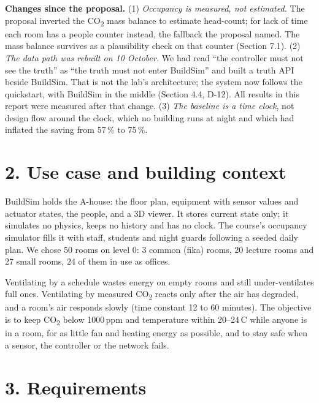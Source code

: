 \documentclass[11pt]{article}
\newcommand{\cotwo}{CO\textsubscript{2}}
\begin{document}
\textbf{Changes since the proposal.}
(1) \emph{Occupancy is measured, not estimated.} The proposal inverted the \cotwo{} mass
balance to estimate head-count; for lack of time each room has a people counter instead,
the fallback the proposal named. The mass balance survives as a plausibility check on that
counter (Section 7.1). (2) \emph{The data path was rebuilt on 10 October.} We had read
``the controller must not see the truth'' as ``the truth must not enter BuildSim'' and
built a truth API beside BuildSim. That is not the lab's architecture; the system now
follows the quickstart, with BuildSim in the middle (Section 4.4, D-12). All results in
this report were measured after that change. (3) \emph{The baseline is a time clock}, not
design flow around the clock, which no building runs at night and which had inflated the
saving from 57\,\% to 75\,\%.

\section{2. Use case and building context}

BuildSim holds the A-house: the floor plan, equipment with sensor values and actuator
states, the people, and a 3D viewer. It stores current state only; it simulates no
physics, keeps no history and has no clock. The course's occupancy simulator fills it with
staff, students and night guards following a seeded daily plan. We chose 50 rooms on
level 0: 3 common (fika) rooms, 20 lecture rooms and 27 small rooms, 24 of them in use as offices.

Ventilating by a schedule wastes energy on empty rooms and still under-ventilates full
ones. Ventilating by measured \cotwo{} reacts only after the air has degraded, and a
room's air responds slowly (time constant 12 to 60 minutes). The objective is to keep
\cotwo{} below 1000\,ppm and temperature within 20--24\,\textdegree C while anyone is in a
room, for as little fan and heating energy as possible, and to stay safe when a sensor,
the controller or the network fails.

\section{3. Requirements}
\end{document}
